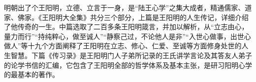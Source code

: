 \begin{book}[《王阳明大全集》]
    明朝出了个王阳明，立德、立言于一身，是“陆王心学”之集大成者，精通儒家、道家、佛家。《王阳明大全集》共分三个部分，上篇是王阳明的人生传记，详细介绍了他传奇的一生。中篇选取了二百多条王阳明箴言，并加以解析，从“立志由心，量力而行”“持纯粹心，做至诚人”“静察己过，不论他人是非”“入世心做事，出世心做人”等十九个方面阐释了王阳明在立志、修心、仁爱、至诚等方面修身处世的人生智慧。下篇《传习录》是王阳明门人子弟所记录的王氏讲学言论及其答友人弟子的论学书信的汇编，它包含了王阳明全部的哲学体系及基本主张，是研习阳明心学的最基本的著作。
\end{book}
